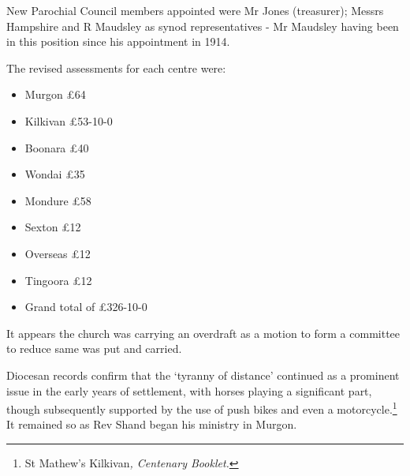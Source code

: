 New Parochial Council members appointed were Mr Jones (treasurer); Messrs Hampshire and R Maudsley as synod representatives - Mr Maudsley having been in this position since his appointment in 1914.



The revised assessments for each centre were:



\begin{itemize}

\item

  Murgon \pounds64

\item

  Kilkivan \pounds53-10-0

\item

  Boonara \pounds40

\item

  Wondai \pounds35

\item

  Mondure \pounds58

\item

  Sexton \pounds12

\item

  Overseas \pounds12

\item

  Tingoora \pounds12

\item

  Grand total of \pounds326-10-0

\end{itemize}



\smallskip


It appears the church was carrying an overdraft as a motion to form a committee to reduce same was put and carried.



Diocesan records confirm that the `tyranny of distance' continued as a prominent issue in the early years of settlement, with horses playing a significant part, though subsequently supported by the use of push bikes and even a motorcycle.\footnote{St Mathew's Kilkivan\emph{, Centenary Booklet.}} It remained so as Rev Shand began his ministry in Murgon.


